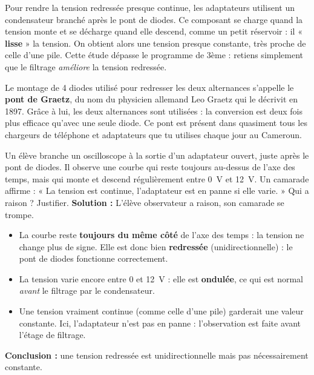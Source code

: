 \documentclass[11pt]{article}
\newcommand{\cle}[1]{{\popxbold\color{popdark}#1}}
\begin{document}
\begin{savaistu}
Pour rendre la tension redressée presque continue, les adaptateurs utilisent un \cle{condensateur} branché après le pont de diodes. Ce composant se charge quand la tension monte et se décharge quand elle descend, comme un petit réservoir : il « \textbf{lisse} » la tension. On obtient alors une tension presque constante, très proche de celle d'une pile. Cette étude dépasse le programme de 3ème : retiens simplement que le filtrage \emph{améliore} la tension redressée.
\end{savaistu}

\begin{savaistu}
Le montage de 4 diodes utilisé pour redresser les deux alternances s'appelle le \textbf{pont de Graetz}, du nom du physicien allemand Leo Graetz qui le décrivit en 1897. Grâce à lui, les deux alternances sont utilisées : la conversion est deux fois plus efficace qu'avec une seule diode. Ce pont est présent dans quasiment tous les chargeurs de téléphone et adaptateurs que tu utilises chaque jour au Cameroun.
\end{savaistu}

\begin{exoresolu}
Un élève branche un oscilloscope à la sortie d'un adaptateur ouvert, juste après le pont de diodes. Il observe une courbe qui reste toujours au-dessus de l'axe des temps, mais qui monte et descend régulièrement entre \SI{0}{V} et \SI{12}{V}. Un camarade affirme : « La tension est continue, l'adaptateur est en panne si elle varie. » Qui a raison ? Justifier.
\tcblower
\textbf{Solution :} L'élève observateur a raison, son camarade se trompe.
\begin{itemize}
\item La courbe reste \textbf{toujours du même côté} de l'axe des temps : la tension ne change plus de signe. Elle est donc bien \textbf{redressée} (unidirectionnelle) : le pont de diodes fonctionne correctement.
\item La tension varie encore entre 0 et \SI{12}{V} : elle est \textbf{ondulée}, ce qui est normal \emph{avant} le filtrage par le condensateur.
\item Une tension vraiment continue (comme celle d'une pile) garderait une valeur constante. Ici, l'adaptateur n'est pas en panne : l'observation est faite avant l'étage de filtrage.
\end{itemize}
\textbf{Conclusion :} une tension redressée est unidirectionnelle mais pas nécessairement constante.
\end{exoresolu}
\end{document}

